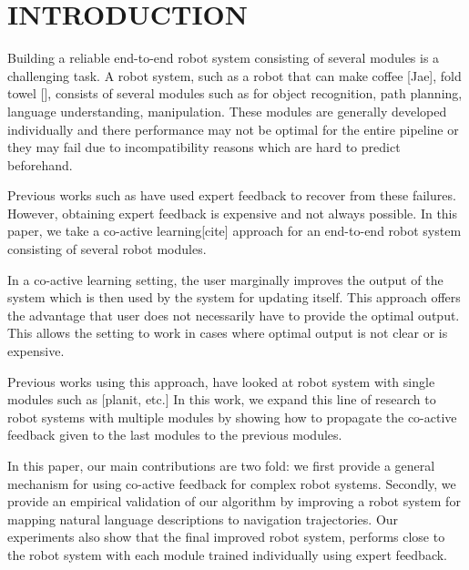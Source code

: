 \section{INTRODUCTION}

Building a reliable end-to-end robot system consisting of several modules is a challenging task.
A robot system, such as a robot that can make coffee [Jae], fold towel [], consists of several
modules such as for object recognition, path planning, language understanding, manipulation. These modules
are generally developed individually and there performance may not be optimal for the entire pipeline or they may fail due to incompatibility reasons which are hard to predict beforehand.

Previous works such as \cite{abbeel2010autonomous} have used expert feedback to recover from these failures. However, obtaining expert feedback is expensive and not always possible. In this paper, we take a co-active learning[cite] approach for an end-to-end robot system consisting of several robot modules. 

In a co-active learning setting, the user marginally improves the output of the system which is then used by the system for updating itself. This approach offers the advantage that user does not necessarily have to provide the optimal output. This allows the setting to work in cases where optimal output is not clear or is expensive. 

Previous works using this approach, have looked at robot system with single modules such as [planit, etc.] 
In this work, we expand this line of research to robot systems with multiple modules by showing how to propagate the co-active feedback given to the last modules to the previous modules.


In this paper, our main contributions are two fold: we first provide a general mechanism
for using co-active feedback for complex robot systems. Secondly, we provide an empirical validation of 
our algorithm by improving a robot system for mapping natural language descriptions to navigation  trajectories. Our experiments also show that the final improved robot system, performs close to the robot system with each module trained individually using expert feedback.

